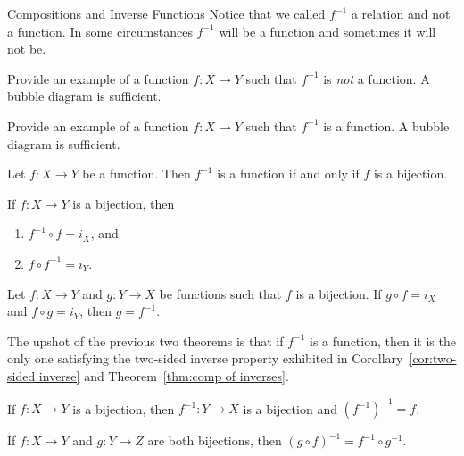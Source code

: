 \begin{section}{Compositions and Inverse Functions}
Notice that we called $f^{-1}$ a relation and not a function.  In some circumstances $f^{-1}$ will be a function and sometimes it will not be.

\begin{exercise}
Provide an example of a function $f:X\to Y$ such that $f^{-1}$ is \emph{not} a function.  A bubble diagram is sufficient.
\end{exercise}

\begin{exercise}
Provide an example of a function $f:X\to Y$ such that $f^{-1}$ is a function. A bubble diagram is sufficient.
\end{exercise}

\begin{theorem}
Let $f:X\to Y$ be a function.  Then $f^{-1}$ is a function if and only if $f$ is a bijection.
\end{theorem}

\begin{theorem}\label{thm:comp of inverses}
If $f:X\to Y$ is a bijection, then
\begin{enumerate}[label=\textrm{(\alph*)}]
\item $f^{-1}\circ f=i_X$, and
\item $f\circ f^{-1}=i_Y$.
\end{enumerate}
\end{theorem}

\begin{theorem}\label{thm:unique inverse}
Let $f:X\to Y$ and $g:Y\to X$ be functions such that $f$ is a bijection.  If $g\circ f=i_X$ and $f\circ g=i_Y$, then $g=f^{-1}$.
\end{theorem}

The upshot of the previous two theorems is that if $f^{-1}$ is a function, then it is the only one satisfying the two-sided inverse property exhibited in Corollary~\ref{cor:two-sided inverse} and Theorem~\ref{thm:comp of inverses}. %

\begin{theorem}
If $f:X\to Y$ is a bijection, then $f^{-1}:Y\to X$ is a bijection and $(f^{-1})^{-1}=f$.
\end{theorem}

\begin{theorem}
If $f:X\to Y$ and $g:Y\to Z$ are both bijections, then $(g\circ f)^{-1}=f^{-1}\circ g^{-1}$.
\end{theorem}


\end{section}
